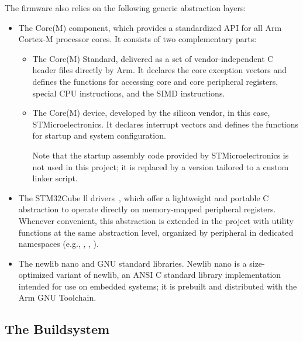 The firmware also relies on the following generic abstraction layers:
\begin{itemize}
    \item The  Core(M) component, which provides a standardized API for all Arm Cortex-M processor cores. It consists of two complementary parts:
    \begin{itemize}
        \item The Core(M) Standard, delivered as a set of vendor-independent C header files directly by Arm. It declares the core exception vectors and defines the functions for accessing core and core peripheral registers, special CPU instructions, and the SIMD instructions.

        \item The Core(M) device, developed by the silicon vendor, in this case, STMicroelectronics. It declares interrupt vectors and defines the functions for startup and system configuration.

        Note that the startup assembly code provided by STMicroelectronics is not used in this project; it is replaced by a \cpp version tailored to a custom linker script.
    \end{itemize}

    \item The STM32Cube \ac{ll} drivers~\cite{UM1725}, which offer a lightweight and portable C abstraction to operate directly on memory-mapped peripheral registers. Whenever convenient, this abstraction is extended in the project with utility functions at the same abstraction level, organized by peripheral in dedicated namespaces (e.g., , , ).

    \item The newlib nano and GNU standard \cpp libraries. Newlib nano is a size-optimized variant of newlib, an ANSI C standard library implementation intended for use on embedded systems; it is prebuilt and distributed with the Arm GNU Toolchain.
\end{itemize}

\subsection{The Buildsystem}\label{subsec:buildsys}

